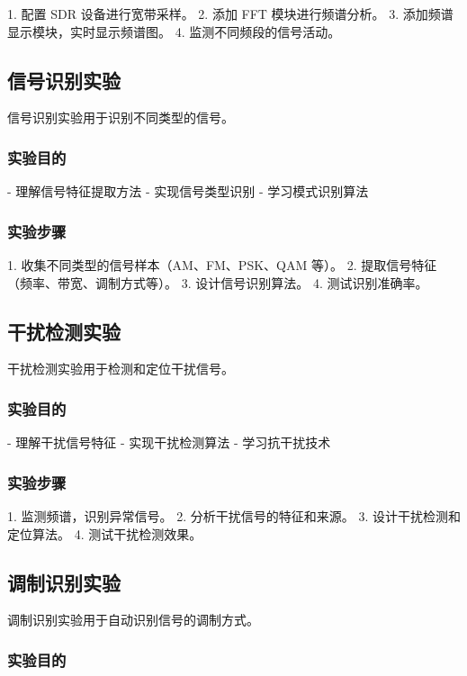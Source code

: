 \documentclass[UTF8]{ctexbook}
\begin{document}
1. 配置 SDR 设备进行宽带采样。
2. 添加 FFT 模块进行频谱分析。
3. 添加频谱显示模块，实时显示频谱图。
4. 监测不同频段的信号活动。

\subsection{信号识别实验}

信号识别实验用于识别不同类型的信号。

\subsubsection{实验目的}

- 理解信号特征提取方法
- 实现信号类型识别
- 学习模式识别算法

\subsubsection{实验步骤}

1. 收集不同类型的信号样本（AM、FM、PSK、QAM 等）。
2. 提取信号特征（频率、带宽、调制方式等）。
3. 设计信号识别算法。
4. 测试识别准确率。

\subsection{干扰检测实验}

干扰检测实验用于检测和定位干扰信号。

\subsubsection{实验目的}

- 理解干扰信号特征
- 实现干扰检测算法
- 学习抗干扰技术

\subsubsection{实验步骤}

1. 监测频谱，识别异常信号。
2. 分析干扰信号的特征和来源。
3. 设计干扰检测和定位算法。
4. 测试干扰检测效果。

\subsection{调制识别实验}

调制识别实验用于自动识别信号的调制方式。

\subsubsection{实验目的}
\end{document}
